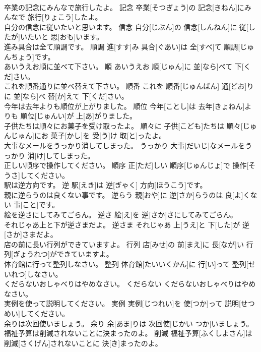 \documentclass[8pt]{extreport}
\begin{document}
\begin{CJK}{UTF8}{min}
\\	卒業の記念にみんなで旅行したよ。	記念	卒業[そつぎょう]の 記念[きねん]にみんなで 旅行[りょこう]したよ。	
\\	自分の信念に従いたいと思います。	信念	自分[じぶん]の 信念[しんねん]に 従[したが]いたいと 思[おも]います。	
\\	進み具合は全て順調です。	順調	進[すす]み 具合[ぐあい]は 全[すべ]て 順調[じゅんちょう]です。	
\\	あいうえお順に並べて下さい。	順	あいうえお 順[じゅん]に 並[なら]べて 下[くだ]さい。	
\\	これを順番通りに並べ替えて下さい。	順番	これを 順番[じゅんばん] 通[どお]りに 並[なら]べ 替[か]えて 下[くだ]さい。	
\\	今年は去年よりも順位が上がりました。	順位	今年[ことし]は 去年[きょねん]よりも 順位[じゅんい]が 上[あ]がりました。	
\\	子供たちは順々にお菓子を受け取ったよ。	順々に	子供[こども]たちは 順々[じゅんじゅん]にお 菓子[かし]を 受[う]け 取[と]ったよ。	
\\	大事なメールをうっかり消してしまった。	うっかり	大事[だいじ]なメールをうっかり 消[け]してしまった。	
\\	正しい順序で操作してください。	順序	正[ただ]しい 順序[じゅんじょ]で 操作[そうさ]してください。	
\\	駅は逆方向です。	逆	駅[えき]は 逆[ぎゃく] 方向[ほうこう]です。	
\\	親に逆らうのは良くない事です。	逆らう	親[おや]に 逆[さか]らうのは 良[よ]くない 事[こと]です。	
\\	絵を逆さにしてみてごらん。	逆さ	絵[え]を 逆[さか]さにしてみてごらん。	
\\	それじゃあ上と下が逆さまだよ。	逆さま	それじゃあ 上[うえ]と 下[した]が 逆[さか]さまだよ。	
\\	店の前に長い行列ができていますよ。	行列	店[みせ]の 前[まえ]に 長[なが]い 行列[ぎょうれつ]ができていますよ。	
\\	体育館に行って整列しなさい。	整列	体育館[たいいくかん]に 行[い]って 整列[せいれつ]しなさい。	
\\	くだらないおしゃべりはやめなさい。	くだらない	くだらないおしゃべりはやめなさい。	
\\	実例を使って説明してください。	実例	実例[じつれい]を 使[つか]って 説明[せつめい]してください。	
\\	余りは次回使いましょう。	余り	余[あま]りは 次回使[じかい つか]いましょう。	
\\	福祉予算は削減されないことに決まったのよ。	削減	福祉予算[ふくしよさん]は 削減[さくげん]されないことに 決[き]まったのよ。	

\end{CJK}
\end{document}
